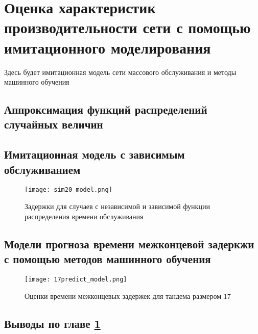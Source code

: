 \chapter{Оценка характеристик производительности сети с помощью имитационного моделирования}\label{prediction_model}
Здесь будет имитационная модель сети массового обслуживания и методы машинного обучения
\section{Аппроксимация функций распределений случайных величин}
\section{Имитационная модель с зависимым обслуживанием}
\begin{figure}[h!]
  \centering
   \texttt{[image: sim20\_model.png]}
\caption{Задержки для случаев с независимой и зависимой функции распределения времени обслуживания}
\label{fig:sim20_model}
\end{figure}

\section{Модели прогноза времени межконцевой задеркжи с помощью методов машинного обучения}
\begin{figure}[h!]
    \centering
     \texttt{[image: 17predict\_model.png]}
  \caption{Оценки времени межконцевых задержек для тандема размером 17}
  \label{fig:17predict_model}
\end{figure}

\section{Выводы по главе \cref{prediction_model}}




